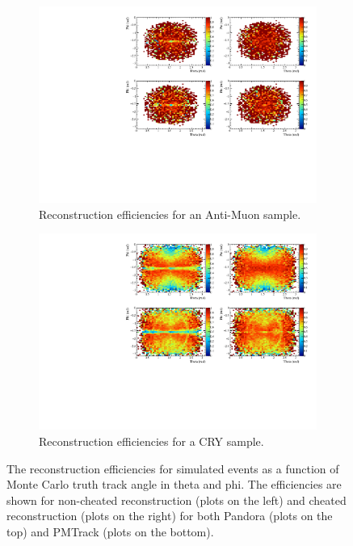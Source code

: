 \begin{figure}[h!]
  \centering
  \begin{subfigure}{0.45\textwidth}
    \centering
    \includegraphics[width=\textwidth]{Effic_AntiMuon_500V_All_PhiTheta}
    \caption{Reconstruction efficiencies for an Anti-Muon sample.}
    \label{fig:SimEffic_ThetaPhi_AMu}
  \end{subfigure}
  \hspace{0.08\textwidth}
  \begin{subfigure}{0.45\textwidth}
    \centering
    \includegraphics[width=\textwidth]{Effic_Cosmics_500V_All_PhiTheta}
    \caption{Reconstruction efficiencies for a CRY sample.}
    \label{fig:SimEffic_ThetaPhi_CRY}
  \end{subfigure}
  \caption[The reconstruction efficiencies for simulated events as a function of Monte Carlo truth track angle in theta and phi.]
          {The reconstruction efficiencies for simulated events as a function of Monte Carlo truth track angle in theta and phi. The efficiencies are shown for non-cheated reconstruction (plots on the left) and cheated reconstruction (plots on the right) for both Pandora (plots on the top) and PMTrack (plots on the bottom).}
          \label{fig:SimEffic_ThetaPhi}
\end{figure}


